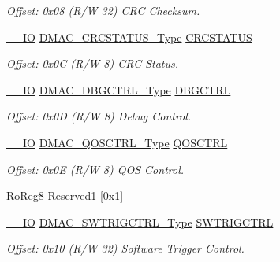 \begin{DoxyCompactItemize}
\begin{DoxyCompactList}\small\item\em Offset\+: 0x08 (R/W 32) C\+RC Checksum. \end{DoxyCompactList}\item 
\mbox{\hyperlink{core__cm0plus_8h_aec43007d9998a0a0e01faede4133d6be}{\+\_\+\+\_\+\+IO}} \mbox{\hyperlink{union_d_m_a_c___c_r_c_s_t_a_t_u_s___type}{D\+M\+A\+C\+\_\+\+C\+R\+C\+S\+T\+A\+T\+U\+S\+\_\+\+Type}} \mbox{\hyperlink{struct_dmac_af66ca4b9f5a6270cd37a5322e41e27af}{C\+R\+C\+S\+T\+A\+T\+US}}
\begin{DoxyCompactList}\small\item\em Offset\+: 0x0C (R/W 8) C\+RC Status. \end{DoxyCompactList}\item 
\mbox{\hyperlink{core__cm0plus_8h_aec43007d9998a0a0e01faede4133d6be}{\+\_\+\+\_\+\+IO}} \mbox{\hyperlink{union_d_m_a_c___d_b_g_c_t_r_l___type}{D\+M\+A\+C\+\_\+\+D\+B\+G\+C\+T\+R\+L\+\_\+\+Type}} \mbox{\hyperlink{struct_dmac_af28d69d1472a67b2881b73eec8dd366f}{D\+B\+G\+C\+T\+RL}}
\begin{DoxyCompactList}\small\item\em Offset\+: 0x0D (R/W 8) Debug Control. \end{DoxyCompactList}\item 
\mbox{\hyperlink{core__cm0plus_8h_aec43007d9998a0a0e01faede4133d6be}{\+\_\+\+\_\+\+IO}} \mbox{\hyperlink{union_d_m_a_c___q_o_s_c_t_r_l___type}{D\+M\+A\+C\+\_\+\+Q\+O\+S\+C\+T\+R\+L\+\_\+\+Type}} \mbox{\hyperlink{struct_dmac_a421b7353ef375d478b4f09ca5d74f2df}{Q\+O\+S\+C\+T\+RL}}
\begin{DoxyCompactList}\small\item\em Offset\+: 0x0E (R/W 8) Q\+OS Control. \end{DoxyCompactList}\item 
\mbox{\hyperlink{group___s_a_m_d21_e15_a__definitions_ga0d957f1433aaf5d70e4dc2b68288442d}{Ro\+Reg8}} \mbox{\hyperlink{struct_dmac_a092866123ac46d0985136e4dca2f36f4}{Reserved1}} \mbox{[}0x1\mbox{]}
\item 
\mbox{\hyperlink{core__cm0plus_8h_aec43007d9998a0a0e01faede4133d6be}{\+\_\+\+\_\+\+IO}} \mbox{\hyperlink{union_d_m_a_c___s_w_t_r_i_g_c_t_r_l___type}{D\+M\+A\+C\+\_\+\+S\+W\+T\+R\+I\+G\+C\+T\+R\+L\+\_\+\+Type}} \mbox{\hyperlink{struct_dmac_a3e1671940da05ad5800230cf398310d0}{S\+W\+T\+R\+I\+G\+C\+T\+RL}}
\begin{DoxyCompactList}\small\item\em Offset\+: 0x10 (R/W 32) Software Trigger Control. \end{DoxyCompactList}\item 

\end{DoxyCompactItemize}
